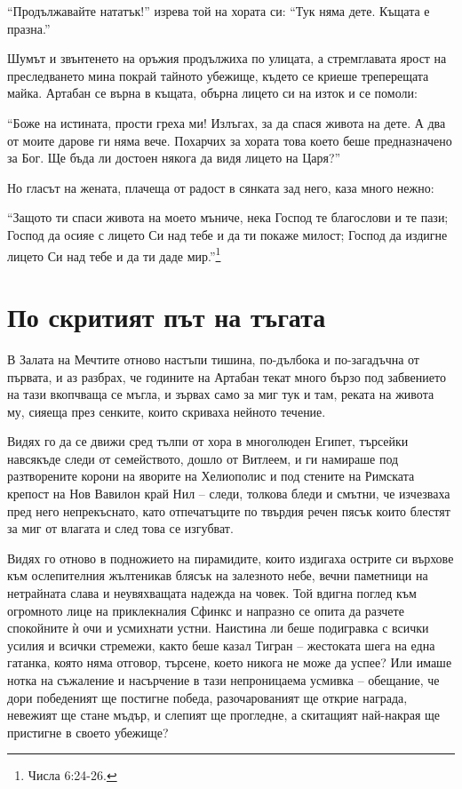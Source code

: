 \documentclass[oneside,10pt]{memoir}
\begin{document}
``Продължавайте нататък!'' изрева той на хората си: ``Тук няма дете. Къщата е
празна.''

Шумът и звънтенето на оръжия продължиха по улицата, а стремглавата ярост на
преследването мина покрай тайното убежище, където се криеше треперещата майка.
Артабан се върна в къщата, обърна лицето си на изток и се помоли:

``Боже на истината, прости греха ми! Излъгах, за да спася живота на дете. А два
от моите дарове ги няма вече. Похарчих за хората това което беше предназначено
за Бог. Ще бъда ли достоен някога да видя лицето на Царя?''

Но гласът на жената, плачеща от радост в сянката зад него, каза много нежно:

``Защото ти спаси живота на моето мъниче, нека Господ те благослови и те пази;
Господ да осияе с лицето Си над тебе и да ти покаже милост; Господ да издигне
лицето Си над тебе и да ти даде мир.''\footnote{Числа 6:24-26.}

\part{По скритият път на тъгата}

В Залата на Мечтите отново настъпи тишина, по-дълбока и по-загадъчна от първата,
и аз разбрах, че годините на Артабан текат много бързо под забвението на тази
вкопчваща се мъгла, и зървах само за миг тук и там, реката на живота му, сияеща
през сенките, които скриваха нейното течение.

Видях го да се движи сред тълпи от хора в многолюден Египет, търсейки навсякъде
следи от семейството, дошло от Витлеем, и ги намираше под разтворените корони на
яворите на Хелиополис и под стените на Римската крепост на Нов Вавилон край Нил
-- следи, толкова бледи и смътни, че изчезваха пред него непрекъснато, като
отпечатъците по твърдия речен пясък които блестят за миг от влагата и след това
се изгубват.

Видях го отново в подножието на пирамидите, които издигаха острите си върхове
към ослепителния жълтеникав блясък на залезното небе, вечни паметници на
нетрайната слава и неувяхващата надежда на човек. Той вдигна поглед към
огромното лице на приклекналия Сфинкс и напразно се опита да разчете спокойните
ѝ очи и усмихнати устни. Наистина ли беше подигравка с всички усилия и всички
стремежи, както беше казал Тигран -- жестоката шега на една гатанка, която няма
отговор, търсене, което никога не може да успее? Или имаше нотка на съжаление и
насърчение в тази непроницаема усмивка -- обещание, че дори победеният ще
постигне победа, разочарованият ще открие награда, невежият ще стане мъдър, и
слепият ще прогледне, а скитащият най-накрая ще пристигне в своето убежище?
\end{document}
